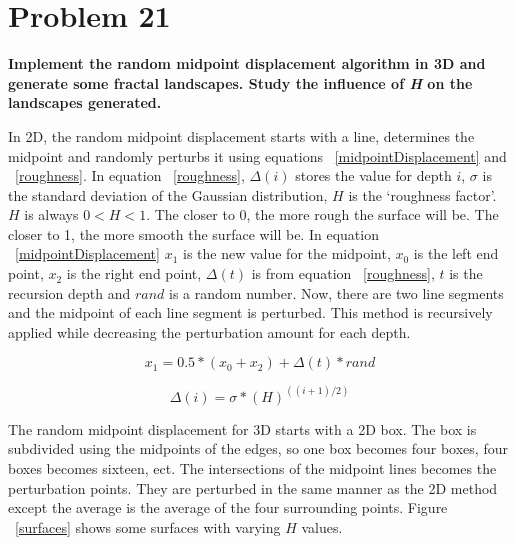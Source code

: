 \section{ Problem 21 }
\textbf{ Implement the random midpoint displacement algorithm in 3D and generate some fractal landscapes. Study the influence of \textit{H} on the landscapes generated. } \\
\newline

In 2D, the random midpoint displacement starts with a line, determines the midpoint and randomly perturbs it using equations ~\ref{midpointDisplacement} and ~\ref{roughness}. In equation ~\ref{roughness}, $\Delta(i)$ stores the value for depth $i$, $\sigma$ is the standard deviation of the Gaussian distribution, $H$ is the `roughness factor'. $H$ is always $ 0 < H < 1$. The closer to 0, the more rough the surface will be. The closer to 1, the more smooth the surface will be.  In equation ~\ref{midpointDisplacement} $x_1$ is the new value for the midpoint, $x_0$ is the left end point, $x_2$ is the right end point, $\Delta(t)$ is  from equation ~\ref{roughness}, $t$ is the recursion depth and $rand$ is a random number. Now, there are two line segments and the midpoint of each line segment is perturbed. This method is recursively applied while decreasing the perturbation amount for each depth. 

\begin{equation}
x_1 = 0.5 * ( x_0 + x_2 ) + \Delta(t) * rand
\end{equation} \label{midpointDisplacement}

\begin{equation}
\Delta(i) = \sigma*(H)^((i+1)/2)
\end{equation} \label{roughness}

The random midpoint displacement for 3D starts with a 2D box. The box is subdivided using the midpoints of the edges, so one box becomes four boxes, four boxes becomes sixteen, ect. The intersections of the midpoint lines becomes the perturbation points. They are perturbed in the same manner as the 2D method except the average is the average of the four surrounding points. Figure ~\ref{surfaces} shows some surfaces with varying $H$ values.


